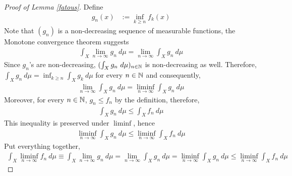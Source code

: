 \documentclass[11pt]{article}
\begin{document}
	\begin{proof}[Proof of Lemma \ref{fatous}]
	    Define
	    \begin{align}
	        g_n(x) &:= \inf_{k \geq n} f_k(x)
	    \end{align}
	    Note that $(g_n)$ is a non-decreasing sequence of measurable functions, the Monotone convergence theorem suggests
	    \begin{align}
	        \int_X \lim_{n \to \infty} g_n\ d\mu
	        = \lim_{n\to\infty} \int_X g_n\ d\mu
	    \end{align}
	    Since $g_n$'s are non-decreasing, $(\int_X g_n\ d\mu)_{n \in \mathbb{N}}$ is non-decreasing as well.
	    Therefore, $\int_X g_n\ d\mu = \inf_{k \geq n} \int_X g_k\ d\mu$ for every $n \in \mathbb{N}$ and consequently,
	    \begin{align}
	        \lim_{n\to\infty}\int_X g_n\ d\mu = \liminf_{n\to\infty}\int_X g_n\ d\mu
	    \end{align}
	    Moreover, for every $n \in \mathbb{N}$, $g_n \leq f_n$ by the definition, therefore,
	    \begin{align}
	        \int_X g_n\ d\mu \leq \int_X f_n\ d\mu
	    \end{align}
	    This inequality is preserved under $\liminf$, hence
	    \begin{align}
	        \liminf_{n\to\infty}\int_X g_n\ d\mu \leq \liminf_{n\to\infty}\int_X f_n\ d\mu
	    \end{align}
	    Put everything together, 
	    \begin{align}
	        \int_X \liminf_{n \to \infty}f_n\ d\mu
	        \equiv\int_X \lim_{n \to \infty} g_n\ d\mu
	        = \lim_{n\to\infty} \int_X g_n\ d\mu
	        = \liminf_{n\to\infty}\int_X g_n\ d\mu
	        \leq \liminf_{n\to\infty}\int_X f_n\ d\mu
	    \end{align}
	\end{proof}
\end{document}
